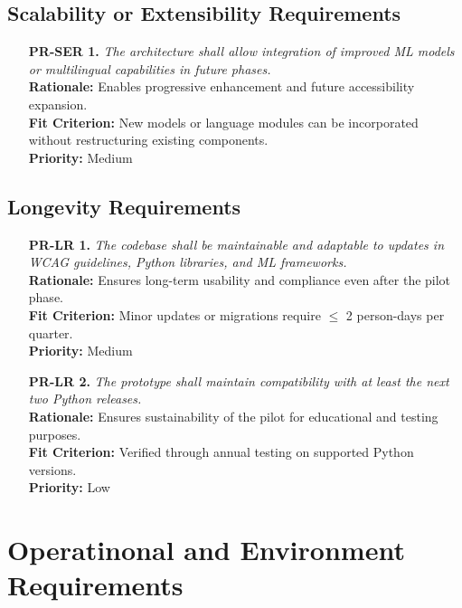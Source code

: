 \documentclass[12pt]{article}
\begin{document}
\subsection{Scalability or Extensibility Requirements}
\begin{itemize}
  \item[\textbf{PR-SER 1.}] \textit{The architecture shall allow
      integration of improved ML models or multilingual capabilities in
    future phases.}\\
    \textbf{Rationale:} Enables progressive enhancement and future
    accessibility expansion.\\
    \textbf{Fit Criterion:} New models or language modules can be
    incorporated without restructuring existing components.\\
    \textbf{Priority:} Medium
\end{itemize}

\subsection{Longevity Requirements}
\begin{itemize}
  \item[\textbf{PR-LR 1.}] \textit{The codebase shall be maintainable
      and adaptable to updates in WCAG guidelines, Python libraries,
    and ML frameworks.}\\
    \textbf{Rationale:} Ensures long-term usability and compliance
    even after the pilot phase.\\
    \textbf{Fit Criterion:} Minor updates or migrations require
    $\leq$ 2 person-days per quarter.\\
    \textbf{Priority:} Medium

  \item[\textbf{PR-LR 2.}] \textit{The prototype shall maintain
    compatibility with at least the next two Python releases.}\\
    \textbf{Rationale:} Ensures sustainability of the pilot for
    educational and testing purposes.\\
    \textbf{Fit Criterion:} Verified through annual testing on
    supported Python versions.\\
    \textbf{Priority:} Low
\end{itemize}

\section{Operatinonal and Environment Requirements}
\end{document}
